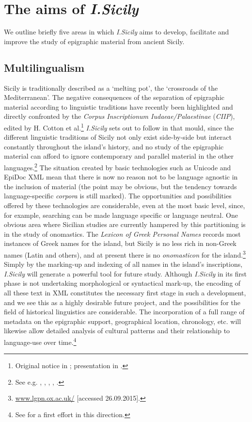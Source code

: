 \documentclass[amsthm,ebook]{saparticle}
\begin{document}
\section{The aims of \emph{I.Sicily}}
\noindent We outline briefly five areas in which \emph{I.Sicily} aims to develop, facilitate and improve the study of epigraphic material
from ancient Sicily.




\subsection{Multilingualism}


\noindent Sicily is traditionally described as a `melting pot', the `crossroads of the Mediterranean'. The negative consequences
of the separation of epigraphic material according to linguistic traditions have recently been highlighted and directly
confronted by the \emph{Corpus Inscriptionum Iudaeae/Palaestinae} (\emph{CIIP}), edited by H. Cotton et al.\footnote{ Original notice
in \citet{cotton_corpus_1999}; presentation in \citet{cotton_corpus_2010}.} \emph{I.Sicily} sets out to follow in that mould, since the
different linguistic traditions of Sicily not only exist side-by-side but interact constantly throughout the island’s
history, and no study of the epigraphic material can afford to ignore contemporary and parallel material in the other
languages.\footnote{ See e.g. \citet{manganaro_greco_1993}, \citet{prag_epigraphy_2002}, \citet{salmeri_i_2004}, \citet{korhonen_language_2011}, \citet{tribulato_language_2012}.} The situation
created by basic technologies such as Unicode and EpiDoc XML mean that there is now no reason not to be language
agnostic in the inclusion of material (the point may be obvious, but the tendency towards language-specific \emph{corpora} is
still marked). The opportunities and possibilities offered by these technologies are considerable, even at the most
basic level, since, for example, searching can be made language specific or language neutral. One obvious area where
Sicilian studies are currently hampered by this partitioning is in the study of onomastics. The \emph{Lexicon of Greek
Personal Names} records most instances of Greek names for the island, but Sicily is no less rich in non-Greek names
(Latin and others), and at present there is no \emph{onomasticon} for the island.\footnote{ \url{www.lgpn.ox.ac.uk/} [accessed
26.09.2015].} Simply by the marking-up and indexing of all names in the island’s inscriptions, \emph{I.Sicily} will generate a
powerful tool for future study. Although \emph{I.Sicily} in its first phase is not undertaking morphological or syntactical
mark-up, the encoding of all these text in XML constitutes the necessary first stage in such a development, and we see
this as a highly desirable future project, and the possibilities for the field of historical linguistics are
considerable. The incorporation of a full range of metadata on the epigraphic support, geographical location,
chronology, etc. will likewise allow detailed analysis of cultural patterns and their relationship to language-use over
time.\footnote{ See \citet{prag_epigraphy_2002} for a first effort in this direction.}
\end{document}
